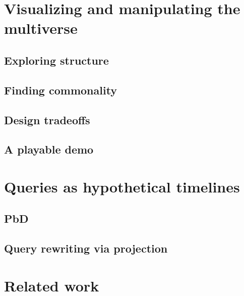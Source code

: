 \documentclass[english,submission]{programming}
\theoremstyle{definition}
\begin{document}



\section{Visualizing and manipulating the multiverse}

\subsection{Exploring structure}

\subsection{Finding commonality}

\subsection{Design tradeoffs}

\subsection{A playable demo}



\section{Queries as hypothetical timelines}

\subsection{PbD}
\subsection{Query rewriting via projection}


\section{Related work}

\end{document}
